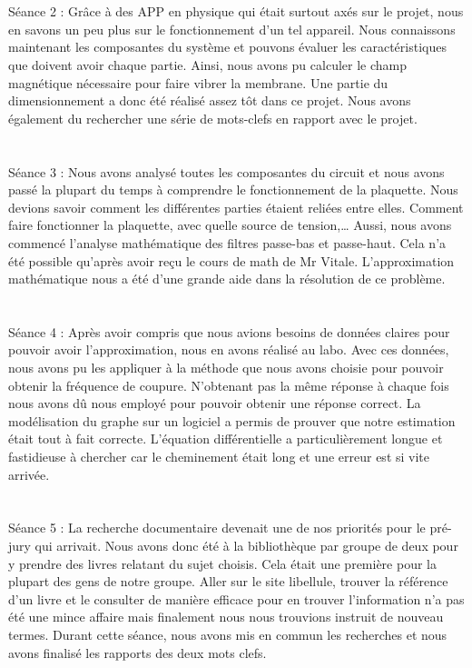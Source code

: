 \documentclass{report}
\begin{document}
\section{}
Séance 2 : Grâce à des APP en physique qui était surtout axés sur le projet, nous en savons un peu plus sur le fonctionnement d’un tel appareil.  Nous connaissons maintenant les composantes du système et pouvons évaluer les caractéristiques que doivent avoir chaque partie.  Ainsi, nous avons pu calculer le champ magnétique nécessaire pour faire vibrer la membrane.  Une partie du dimensionnement a donc été réalisé assez tôt dans ce projet.  Nous avons également du rechercher une série de mots-clefs en rapport avec le projet.

\section{}
Séance 3 : Nous avons analysé toutes les composantes du circuit et nous avons passé la plupart du temps à comprendre le fonctionnement de la plaquette.  Nous devions savoir comment les différentes parties étaient reliées entre elles.  Comment faire fonctionner la plaquette, avec quelle source de tension,…  Aussi, nous avons commencé  l’analyse mathématique des filtres passe-bas et passe-haut.  Cela n’a été possible qu’après avoir reçu le cours de math de Mr Vitale.  L’approximation mathématique nous a été d’une grande aide dans la résolution de ce problème.

\section{}
Séance 4 : Après avoir compris que nous avions besoins de données claires pour pouvoir avoir l’approximation, nous en avons réalisé au labo.  Avec ces données, nous avons pu les appliquer à la méthode que nous avons choisie pour pouvoir obtenir la fréquence de coupure.  N’obtenant pas la même réponse à chaque fois nous avons dû nous employé pour pouvoir obtenir une réponse correct.  La modélisation du graphe sur un logiciel a permis de prouver que notre estimation était tout à fait correcte.  L’équation différentielle a particulièrement longue et fastidieuse à chercher car le cheminement était long et une erreur est si vite arrivée.

\section{}
Séance 5 : La recherche documentaire devenait une de nos priorités pour le pré-jury qui arrivait.  Nous avons donc été à la bibliothèque par groupe de deux pour y prendre des livres relatant du sujet choisis.  Cela était une première pour la plupart des gens de notre groupe.  Aller sur le site libellule, trouver la référence d’un livre et le consulter de manière efficace pour en trouver l’information n’a pas été une mince affaire mais finalement nous nous trouvions instruit de nouveau termes.  Durant cette séance, nous avons mis en commun les recherches et nous avons finalisé les rapports des deux mots clefs.  
\end{document}
